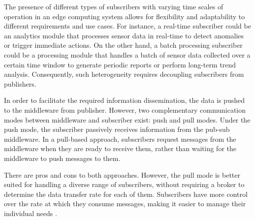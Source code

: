 \documentclass[conference, 10pt]{IEEEtran}
\newcommand{\V}[1]{\quad{\color{blue} #1}\quad}
\begin{document}
The presence of different types of subscribers with varying time scales of operation in an edge computing system allows for flexibility and adaptability to different requirements and use cases. 
For instance, a real-time subscriber could be an analytics module that processes sensor data in real-time to detect anomalies or trigger immediate actions. On the other hand, a batch processing subscriber could be a processing module that handles a batch of sensor data collected over a certain time window to generate periodic reports or perform long-term trend analysis.
Consequently, such heterogeneity requires decoupling subscribers from publishers. 

In order to facilitate the required information dissemination,
the data is pushed to the middleware from publisher. However, 
two complementary communication modes between middleware and subscriber exist: push and pull modes. Under the push mode, the subscriber passively receives information from the pub-sub middleware. In a pull-based approach, subscribers request messages from the middleware when they are ready to receive them, rather than waiting for the middleware to push messages to them.

There are pros and cons to both approaches. However, the pull mode is better suited for handling a diverse range of subscribers, without requiring a broker to determine the data transfer rate for each of them.
Subscribers have more control over the rate at which they consume messages, making it easier to manage their individual needs \cite{kafka}. 

\end{document}
